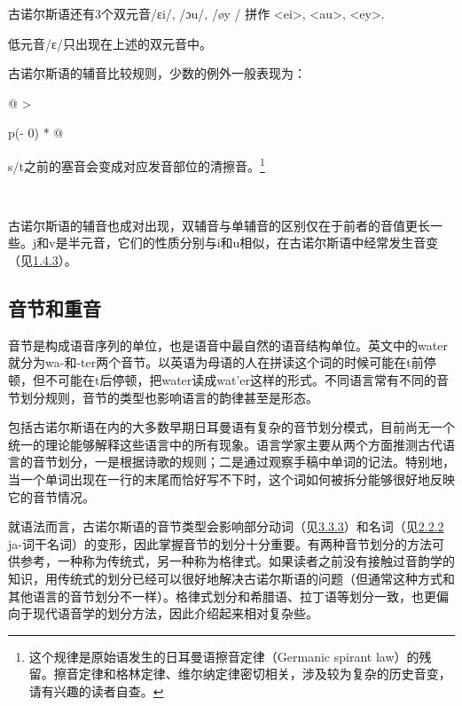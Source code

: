 古诺尔斯语还有3个双元音/ɛi/, /ɔu/, /øy / 拼作 \textless ei\textgreater,
\textless au\textgreater, \textless ey\textgreater.

低元音/ɛ/只出现在上述的双元音中。

古诺尔斯语的辅音比较规则，少数的例外一般表现为：

\begin{longtable}[]{@{}
  >{\raggedright\arraybackslash}p{(\columnwidth - 0\tabcolsep) * }@{}}
\toprule\noalign{}
\begin{minipage}[b]{\linewidth}\raggedright
s/t之前的塞音会变成对应发音部位的清擦音。\footnote{这个规律是原始语发生的日耳曼语擦音定律（Germanic
  spirant
  law）的残留。擦音定律和格林定律、维尔纳定律密切相关，涉及较为复杂的历史音变，请有兴趣的读者自查。\textsubscript{­}}
\end{minipage} \\
\midrule\noalign{}
\endhead
\bottomrule\noalign{}
\endlastfoot
\end{longtable}

古诺尔斯语的辅音也成对出现，双辅音与单辅音的区别仅在于前者的音值更长一些。j和v是半元音，它们的性质分别与i和u相似，在古诺尔斯语中经常发生音变（见\hyperref[ux534aux5143ux97f3ux7684ux4fddux6301ux6027]{1.4.3}）。

\subsection{音节和重音}\label{ux97f3ux8282ux548cux91cdux97f3}

音节是构成语音序列的单位，也是语音中最自然的语音结构单位。英文中的water就分为wa-和-ter两个音节。以英语为母语的人在拼读这个词的时候可能在t前停顿，但不可能在t后停顿，把water读成wat'er这样的形式。不同语言常有不同的音节划分规则，音节的类型也影响语言的韵律甚至是形态。

包括古诺尔斯语在内的大多数早期日耳曼语有复杂的音节划分模式，目前尚无一个统一的理论能够解释这些语言中的所有现象。语言学家主要从两个方面推测古代语言的音节划分，一是根据诗歌的规则；二是通过观察手稿中单词的记法。特别地，当一个单词出现在一行的末尾而恰好写不下时，这个词如何被拆分能够很好地反映它的音节情况。

就语法而言，古诺尔斯语的音节类型会影响部分动词（见\hyperref[ux7b2cux4e00ux5f31ux53d8ux4f4dux6cd5]{3.3.3}）和名词（见\hyperref[ajawa-ux8bcdux5e72]{2.2.2}
ja-词干名词）的变形，因此掌握音节的划分十分重要。有两种音节划分的方法可供参考，一种称为传统式，另一种称为格律式。如果读者之前没有接触过音韵学的知识，用传统式的划分已经可以很好地解决古诺尔斯语的问题（但通常这种方式和其他语言的音节划分不一样）。格律式划分和希腊语、拉丁语等划分一致，也更偏向于现代语音学的划分方法，因此介绍起来相对复杂些。


